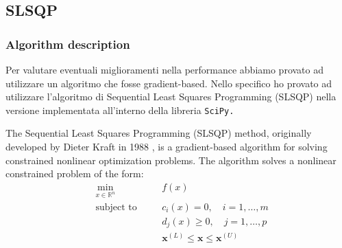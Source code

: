 \subsection{SLSQP}
\subsubsection{Algorithm description}
Per valutare eventuali miglioramenti nella performance abbiamo provato ad utilizzare un algoritmo che fosse gradient-based. 
Nello specifico ho provato ad utilizzare l'algoritmo di Sequential Least Squares Programming (SLSQP) nella versione implementata all'interno della libreria \tt{SciPy}.

The Sequential Least Squares Programming (SLSQP) method, originally developed by Dieter Kraft in 1988 \cite{kraft1988slsqp}, is a gradient-based algorithm for solving constrained nonlinear optimization problems.
The algorithm solves a nonlinear constrained problem of the form:
\begin{align*}
& \min_{x \in \mathbb{R}^n} \quad && f(x) \\
& \text{subject to} \quad && c_i(x) = 0, \quad i = 1, \dots, m \\
& && d_j(x) \geq 0, \quad j = 1, \dots, p \\
& && \mathbf{x}^{(L)} \leq \mathbf{x} \leq \mathbf{x}^{(U)}\\
\end{align*}

